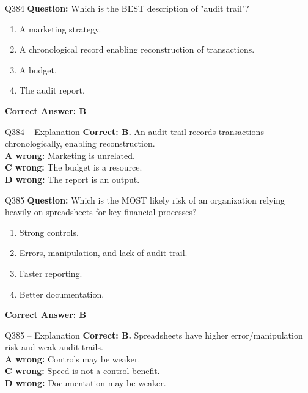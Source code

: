 \documentclass[aspectratio=169,10pt]{beamer}
\begin{document}
	\begin{frame}[t]{Q384}
		\small
		\textbf{Question:} Which is the BEST description of "audit trail"?
		\begin{enumerate}[label=\Alph*.,itemsep=1pt,topsep=2pt]
			\item A marketing strategy.
			\item A chronological record enabling reconstruction of transactions.
			\item A budget.
			\item The audit report.
		\end{enumerate}
		\vspace{4pt}
		\textbf{Correct Answer: B}
	\end{frame}
	
	\begin{frame}[t]{Q384 -- Explanation}
		\small
		\textbf{Correct: B.} An audit trail records transactions chronologically, enabling reconstruction. \\[4pt]
		\textbf{A wrong:} Marketing is unrelated. \\[2pt]
		\textbf{C wrong:} The budget is a resource. \\[2pt]
		\textbf{D wrong:} The report is an output.
	\end{frame}
	
	\begin{frame}[t]{Q385}
		\small
		\textbf{Question:} Which is the MOST likely risk of an organization relying heavily on spreadsheets for key financial processes?
		\begin{enumerate}[label=\Alph*.,itemsep=1pt,topsep=2pt]
			\item Strong controls.
			\item Errors, manipulation, and lack of audit trail.
			\item Faster reporting.
			\item Better documentation.
		\end{enumerate}
		\vspace{4pt}
		\textbf{Correct Answer: B}
	\end{frame}
	
	\begin{frame}[t]{Q385 -- Explanation}
		\small
		\textbf{Correct: B.} Spreadsheets have higher error/manipulation risk and weak audit trails. \\[4pt]
		\textbf{A wrong:} Controls may be weaker. \\[2pt]
		\textbf{C wrong:} Speed is not a control benefit. \\[2pt]
		\textbf{D wrong:} Documentation may be weaker.
	\end{frame}
	
\end{document}
